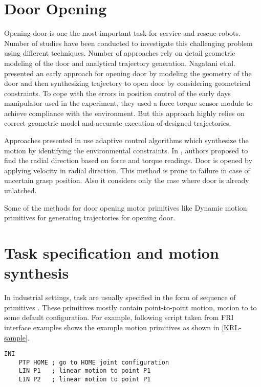 \documentclass[thesis]{mas_proposal}
\begin{document}
\section{Door Opening}

Opening door is one the most important task for service and rescue robots. Number of studies have been conducted to investigate this challenging problem using different techniques. Number of approaches rely on detail geometric modeling of the door and analytical trajectory generation. Nagatani et.al. \cite{nagatani1995experiment} presented an early approach for opening door by modeling the geometry of the door and then synthesizing trajectory to open door by considering geometrical constraints. To cope with the errors in position control of the early days manipulator used in the experiment, they used a force torque sensor module to achieve compliance with the environment. But this approach highly relies on correct geometric model and accurate execution of designed trajectories.

Approaches presented in \cite{levihn2014using,karayiannidis2012adaptive,niemeyer1997simple} use adaptive control algorithms which synthesize the motion by identifying the environmental constraints. In \cite{karayiannidis2012adaptive}, authors proposed to find the radial direction based on force and torque readings. Door is opened by applying velocity in radial direction. This method is prone to failure in case of uncertain grasp position. Also it considers only the case where door is already unlatched. 

Some of the methods for door opening motor primitives like Dynamic motion primitives for generating trajectories for opening door. 

\section{Task specification and motion synthesis}

In industrial settings, task are usually specified in the form of sequence of primitives \cite{leidner2017cognitive}. These primitives mostly contain point-to-point motion, motion to to some default configuration. For example, following script taken from FRI interface examples shows the example motion primitives as shown in \ref{KRL-sample}.

\begin{lstlisting}[label=KRL-sample,caption=KRL code]
	INI
	PTP HOME ; go to HOME joint configuration
	LIN P1   ; linear motion to point P1
	LIN P2	 ; linear motion to point P1
\end{lstlisting}
\end{document}
